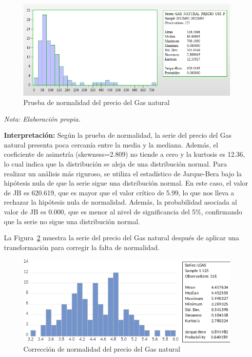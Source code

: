 \documentclass[
  a4paper,
]{article}
\begin{document}
\begin{figure}

\caption{\label{fig-7}Prueba de normalidad del precio del Gas natural}

{\centering \includegraphics{20230603091227.png}

}

\end{figure}

\emph{Nota: Elaboración propia.}

\textbf{Interpretación:} Según la prueba de normalidad, la serie del
precio del Gas natural presenta poca cercanía entre la media y la
mediana. Además, el coeficiente de asimetría (skewness=2.809) no tiende
a cero y la kurtosis es 12.36, lo cual indica que la distribución se
aleja de una distribución normal. Para realizar un análisis más
riguroso, se utiliza el estadístico de Jarque-Bera bajo la hipótesis
nula de que la serie sigue una distribución normal. En este caso, el
valor de JB es 620.619, que es mayor que el valor crítico de 5.99, lo
que nos lleva a rechazar la hipótesis nula de normalidad. Además, la
probabilidad asociada al valor de JB es 0.000, que es menor al nivel de
significancia del 5\%, confirmando que la serie no sigue una
distribución normal.

La Figura~\ref{fig-8} muestra la serie del precio del Gas natural
después de aplicar una transformación para corregir la falta de
normalidad.

\begin{figure}

\caption{\label{fig-8}Corrección de normalidad del precio del Gas
natural}

{\centering \includegraphics{20230603091315.png}

}

\end{figure}
\end{document}
